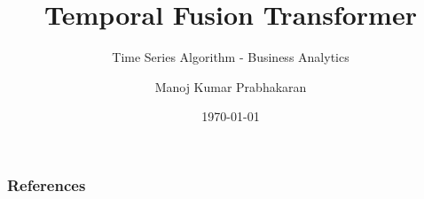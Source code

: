 \documentclass[10pt, a4paper]{beamer}
\title{Temporal Fusion Transformer}
\subtitle{Time Series Algorithm - Business Analytics}
\author{Manoj Kumar Prabhakaran \\}
\date{\today}
\begin{document}






















\begin{frame}[allowframebreaks]

	\frametitle{References}

\printbibliography

\end{frame}


\end{document}

